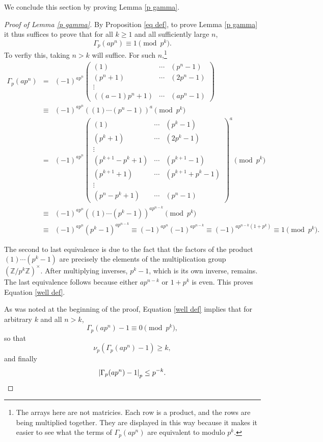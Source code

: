 \documentclass[12pt, letter]{article}    %
\theoremstyle{plain}
\theoremstyle{definition}
\numberwithin{equation}{section}
\newcommand{\lemref}[1]{Lemma \ref{#1}}
\newcommand{\propref}[1]{Proposition \ref{#1}}
\newcommand{\eref}[1]{Equation \ref{#1}}
\begin{document}
We conclude this section by proving \lemref{p gamma}.

\begin{proof}[Proof of \lemref{p gamma}]
By \propref{eq def}, to prove \lemref{p gamma} it thus suffices to prove that for all $k\geq 1$ and all sufficiently large $n$, 
\begin{equation}\label{well def}
\Gamma_p(ap^n)\equiv 1\pmod{p^k}.\end{equation}
To verfiy this, taking $n>k$ will suffice. For such $n$,\footnote{The arrays here are not matricies. Each row is a product, and the rows are being multiplied together. They are displayed in this way because it makes it easier to see what the terms of $\Gamma_p(ap^n)$ are equivalent to modulo $p^k$.}
\begin{eqnarray*}
 \Gamma_p(ap^n)&=&(-1)^{ap^n}
\left(\begin{array}{ccc}
(1) & \cdots & (p^n-1)\\
(p^n+1) & \cdots & (2p^n-1)\\
\vdots\\
((a-1)p^n+1) & \cdots & (ap^n-1)
\end{array}\right)
\\
&\equiv&(-1)^{ap^n}\left((1)\cdots(p^n-1)\right)^a \pmod{p^k}\\
&=&(-1)^{ap^n}
\left(
\begin{array}{ccc}
(1) & \cdots & (p^k-1)\\
(p^k+1) & \cdots & (2p^k-1)\\
\vdots\\
(p^{k+1}-p^k+1) & \cdots & (p^{k+1}-1)\\
(p^{k+1}+1) & \cdots & (p^{k+1}+p^k-1)\\
\vdots\\
(p^n-p^k+1) & \cdots & (p^n-1)
\end{array}
\right)^a\pmod{p^k}\\
&\equiv&(-1)^{ap^n}\left((1)\cdots(p^k-1)\right)^{ap^{n-k}} \pmod{p^k}\\
&\equiv&(-1)^{ap^n}(p^k-1)^{ap^{n-k}}\equiv(-1)^{ap^n}(-1)^{ap^{n-k}}\equiv(-1)^{ap^{n-k}(1+p^k)}\equiv 1\pmod{p^k}.
\end{eqnarray*}

The second to last equivalence is due to the fact that the factors of the product $(1)\cdots(p^k-1)$ are precisely the elements of the multiplication group $(\mathbb{Z}/p^k\mathbb{Z})^\times$. After multiplying inverses, $p^k-1$, which is its own inverse, remains. The last equivalence follows because either $ap^{n-k}$ or $1+p^k$ is even. This proves \eref{well def}.

As was noted at the beginning of the proof, \eref{well def} implies that for arbitrary $k$ and all $n>k$, 
$$\Gamma_p(ap^n)-1\equiv0\pmod{p^k},$$ so that 
$$\nu_p(\Gamma_p(ap^n)-1)\geq k,$$ and finally 
\[\left|\Gamma_p(ap^n)-1\right|_p\leq p^{-k}.\qedhere\] \end{proof}
\end{document}
